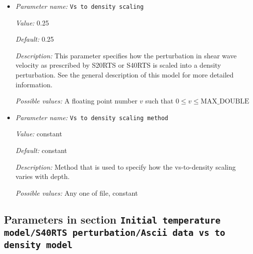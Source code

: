\begin{itemize}
{\it Default:} false


{\it Description:} Option to take the thermal expansion coefficient from the material model instead of from what is specified in this section.


{\it Possible values:} A boolean value (true or false)
\item {\it Parameter name:} {\tt Vs to density scaling}
\label{parameters:Initial temperature model/S40RTS perturbation/Vs to density scaling}


{\it Value:} 0.25


{\it Default:} 0.25


{\it Description:} This parameter specifies how the perturbation in shear wave velocity as prescribed by S20RTS or S40RTS is scaled into a density perturbation. See the general description of this model for more detailed information.


{\it Possible values:} A floating point number $v$ such that $0 \leq v \leq \text{MAX\_DOUBLE}$
\item {\it Parameter name:} {\tt Vs to density scaling method}
\label{parameters:Initial temperature model/S40RTS perturbation/Vs to density scaling method}


{\it Value:} constant


{\it Default:} constant


{\it Description:} Method that is used to specify how the vs-to-density scaling varies with depth.


{\it Possible values:} Any one of file, constant
\end{itemize}



\subsection{Parameters in section \tt Initial temperature model/S40RTS perturbation/Ascii data vs to density model}
\label{parameters:Initial_20temperature_20model/S40RTS_20perturbation/Ascii_20data_20vs_20to_20density_20model}

